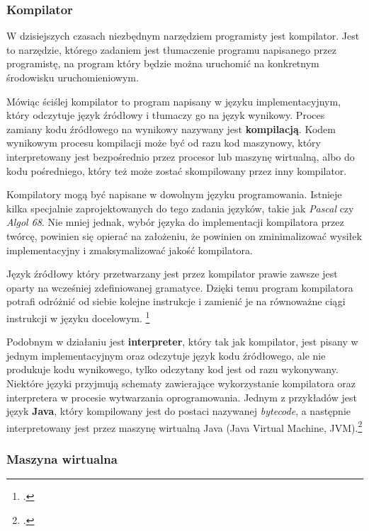 \documentclass[a4paper]{article}
\begin{document}
\subsubsection{Kompilator}
W dzisiejszych czasach niezbędnym narzędziem programisty jest kompilator. Jest to narzędzie, którego zadaniem jest tłumaczenie programu napisanego przez programistę, na program który będzie można uruchomić na konkretnym środowisku uruchomieniowym.
\par Mówiąc ściślej kompilator to program napisany w języku implementacyjnym, który odczytuje język źródłowy i tłumaczy go na język wynikowy. Proces zamiany kodu źródłowego na wynikowy nazywany jest \textbf{kompilacją}. Kodem wynikowym procesu kompilacji może być od razu kod maszynowy, który interpretowany jest bezpośrednio przez procesor lub maszynę wirtualną, albo do kodu pośredniego, który też może zostać skompilowany przez inny kompilator.
\par Kompilatory mogą być napisane w dowolnym języku programowania. Istnieje kilka specjalnie zaprojektowanych do tego zadania języków, takie jak \textit{Pascal} czy \textit{Algol 68}. Nie mniej jednak, wybór języka do implementacji kompilatora przez twórcę, powinien się opierać na założeniu, że powinien on zminimalizować wysiłek implementacyjny i zmaksymalizować jakość kompilatora.
\par Język źródłowy który przetwarzany jest przez kompilator prawie zawsze jest oparty na wcześniej zdefiniowanej gramatyce. Dzięki temu program kompilatora potrafi odróżnić od siebie kolejne instrukcje i zamienić je na równoważne ciągi instrukcji w języku docelowym.
\footcite[1-4]{Mckeeman1974}
\par Podobnym w działaniu jest \textbf{interpreter}, który tak jak kompilator, jest pisany w jednym implementacyjnym oraz odczytuje język kodu źródłowego, ale nie produkuje kodu wynikowego, tylko odczytany kod jest od razu wykonywany. Niektóre języki przyjmują schematy zawierające wykorzystanie kompilatora oraz interpretera w procesie wytwarzania oprogramowania. Jednym z przykładów jest język \textbf{Java}, który kompilowany jest do postaci nazywanej \textit{bytecode}, a następnie interpretowany jest przez maszynę wirtualną Java (Java Virtual Machine, JVM).\footcite[3,4]{EngineeringCompiler}

\subsubsection{Maszyna wirtualna}
\end{document}
